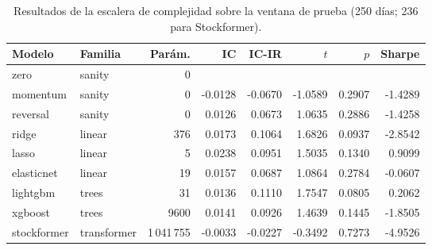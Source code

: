 \begin{table}[htbp]
\centering
\caption{Resultados de la escalera de complejidad sobre la ventana de prueba (250 días;
236 para Stockformer).}
\label{tab:ladder}
\small
\begin{tabular}{llrrrrrr}
\toprule
Modelo & Familia & Parám. & IC & IC-IR & $t$ & $p$ & Sharpe \\
\midrule
zero & sanity & 0 &  &  &  &  &  \\
momentum & sanity & 0 & -0.0128 & -0.0670 & -1.0589 & 0.2907 & -1.4289 \\
reversal & sanity & 0 & 0.0126 & 0.0673 & 1.0635 & 0.2886 & -1.4258 \\
ridge & linear & 376 & 0.0173 & 0.1064 & 1.6826 & 0.0937 & -2.8542 \\
lasso & linear & 5 & 0.0238 & 0.0951 & 1.5035 & 0.1340 & 0.9099 \\
elasticnet & linear & 19 & 0.0157 & 0.0687 & 1.0864 & 0.2784 & -0.0607 \\
lightgbm & trees & 31 & 0.0136 & 0.1110 & 1.7547 & 0.0805 & 0.2062 \\
xgboost & trees & 9600 & 0.0141 & 0.0926 & 1.4639 & 0.1445 & -1.8505 \\
stockformer & transformer & 1\,041\,755 & -0.0033 & -0.0227 & -0.3492 & 0.7273 & -4.9526 \\
\bottomrule
\end{tabular}
\end{table}
